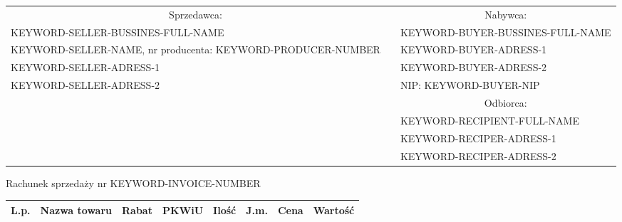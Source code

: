 \documentclass[a4paper]{book}
\begin{document}
\begin{table}[h]
\begin{tabularx}{\textwidth}{X c X}
\cline{1-1} \cline{3-3}
\multicolumn{1}{c}{\cellcolor[HTML]{C0C0C0}Sprzedawca:}                             &  & \multicolumn{1}{c}{\cellcolor[HTML]{C0C0C0}Nabywca:}     \\ \cline{1-1} \cline{3-3} 
\cellcolor[HTML]{FFFFFF}KEYWORD-SELLER-BUSSINES-FULL-NAME                           &  & \cellcolor[HTML]{FFFFFF}KEYWORD-BUYER-BUSSINES-FULL-NAME \\
\cellcolor[HTML]{FFFFFF}KEYWORD-SELLER-NAME, nr producenta: KEYWORD-PRODUCER-NUMBER &  & \cellcolor[HTML]{FFFFFF}KEYWORD-BUYER-ADRESS-1           \\
\cellcolor[HTML]{FFFFFF}KEYWORD-SELLER-ADRESS-1                                     &  & \cellcolor[HTML]{FFFFFF}KEYWORD-BUYER-ADRESS-2           \\
\cellcolor[HTML]{FFFFFF}KEYWORD-SELLER-ADRESS-2                                     &  & \cellcolor[HTML]{FFFFFF}NIP: KEYWORD-BUYER-NIP           \\ \cline{1-1} \cline{3-3} 
                                                                                    &  & \multicolumn{1}{c}{\cellcolor[HTML]{C0C0C0}Odbiorca:}    \\
                                                                                    &  & KEYWORD-RECIPIENT-FULL-NAME                              \\
                                                                                    &  & KEYWORD-RECIPER-ADRESS-1                                 \\
                                                                                    &  & KEYWORD-RECIPER-ADRESS-2                                 \\ \cline{3-3} 
\end{tabularx}
\end{table}


\vspace{0.3cm}
\centering
\begin{Huge}
 Rachunek sprzedaży nr KEYWORD-INVOICE-NUMBER
\end{Huge}


\begin{table}[H]
\centering
\begin{tabularx}{\textwidth}{|l|X|l|l|l|l|l|l|}
\hline
\rowcolor[HTML]{C0C0C0} 
\textbf{L.p.} & \centering\textbf{Nazwa towaru} & \textbf{Rabat} & \textbf{PKWiU} & \textbf{Ilość} & \textbf{J.m.} & \textbf{Cena} & \textbf{Wartość} \\ \hline

\end{tabularx}
\end{table}
\end{document}
